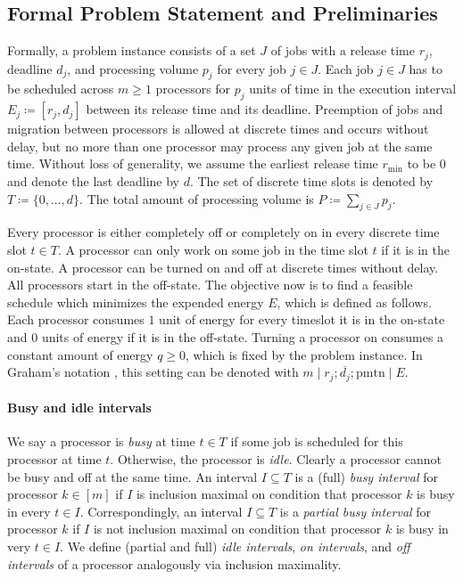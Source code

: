 \documentclass[a4paper]{article}
\begin{document}
\subsection{Formal Problem Statement and Preliminaries}
Formally, a problem instance consists of a set $J$ of jobs with a release time $r_j$, deadline $d_j$, and processing volume $p_j$ for every job $j \in J$.
Each job $j \in J$ has to be scheduled across $m \geq 1$ processors for $p_j$ units of time in the execution interval $E_j \coloneqq [r_j, d_j]$ between its release time and its deadline.
Preemption of jobs and migration between processors is allowed at discrete times and occurs without delay, but no more than one processor may process any given job at the same time.
Without loss of generality, we assume the earliest release time $r_{\min}$ to be $0$ and denote the last deadline by $d$.
The set of discrete time slots is denoted by $T \coloneqq \{0, \ldots, d\}$.
The total amount of processing volume is $P \coloneqq \sum_{j \in J} p_j$.

Every processor is either completely off or completely on in every discrete time slot $t \in T$.
A processor can only work on some job in the time slot $t$ if it is in the on-state.
A processor can be turned on and off at discrete times without delay.
All processors start in the off-state.
The objective now is to find a feasible schedule which minimizes the expended energy $E$, which is defined as follows.
Each processor consumes $1$ unit of energy for every timeslot it is in the on-state and $0$ units of energy if it is in the off-state.
Turning a processor on consumes a constant amount of energy $q \geq 0$, which is fixed by the problem instance.
In Graham's notation \citep{graham}, this setting can be denoted with $m \mid r_j; \overline{d_j}; \mathrm{pmtn} \mid E$.

\paragraph{Busy and idle intervals}
We say a processor is \emph{busy} at time $t \in T$ if some job is scheduled for this processor at time $t$.
Otherwise, the processor is \emph{idle}.
Clearly a processor cannot be busy and off at the same time.
An interval $I \subseteq T$ is a (full) \emph{busy interval} for processor $k \in [m]$ if $I$ is inclusion maximal on condition that processor $k$ is busy in every $t \in I$.
Correspondingly, an interval $I \subseteq T$ is a \emph{partial busy interval} for processor $k$ if $I$ is not inclusion maximal on condition that processor $k$ is busy in very $t \in I$.
We define (partial and full) \emph{idle intervals}, \emph{on intervals}, and \emph{off intervals} of a processor analogously via inclusion maximality.
\end{document}
